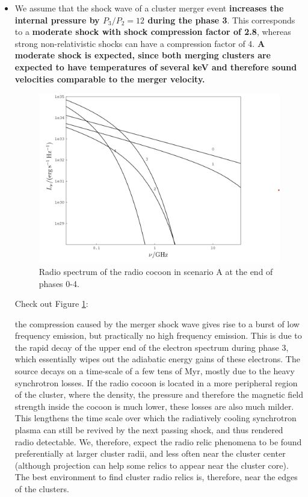 \documentclass[11pt]{report}
\newcommand{\tbf}[1]{\textbf{#1}}
\newcommand{\cbox}{tcolorbox}
\begin{document}
\begin{itemize}
\begin{itemize}
\item We assume that the shock wave of a cluster merger event \tbf{increases the internal pressure by $P_3/P_2 = 12$ during the phase 3}. This corresponds to a \tbf{moderate shock with shock compression factor of 2.8}, whereas strong non-relativistic shocks can have a compression factor of 4. \tbf{A moderate shock is expected, since both merging clusters are expected to have temperatures of several keV and therefore sound velocities comparable to the merger velocity.}
\begin{figure}[h!]\label{figsceA}
\includegraphics[scale=0.7]{figsceA.png}
\caption{Radio spectrum of the radio cocoon in scenario A at the end of phases 0-4.}
\end{figure}
Check out Figure \ref{figsceA}:
\begin{\cbox}
the compression caused by the merger shock wave gives rise to a burst of low frequency emission, but practically no high frequency emission. This is due to the rapid decay of the upper end of the electron spectrum during phase 3, which essentially wipes out the adiabatic energy gains of these electrons. The source decays on a time-scale of a few tens of Myr, mostly due to the heavy synchrotron losses. If the radio cocoon is located in a more peripheral region of the cluster, where the density, the pressure and therefore the magnetic field strength inside the cocoon is much lower, these losses are also much milder. This lengthens the time scale over which the radiatively cooling synchrotron plasma can still be revived by the next passing shock, and thus rendered radio detectable. We, therefore, expect the radio relic phenomena to be found preferentially at larger cluster radii, and less often near the cluster center (although projection can help some relics to appear near the cluster core). The best environment to find cluster radio relics is, therefore, near the edges of the clusters. 

\end{\cbox}
\end{itemize}
\end{itemize}
\end{document}
